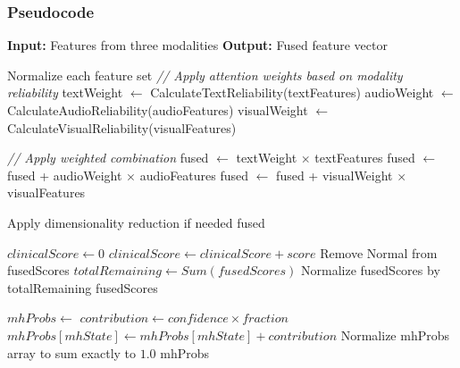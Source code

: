 \documentclass[11pt]{report}
\begin{document}
\subsubsection*{Pseudocode}
\begin{algorithm}[H]
\caption{Multi-modal Feature Fusion}
\label{alg:feature_fusion}
\begin{algorithmic}[1]
    \State \textbf{Input:} Features from three modalities
    \State \textbf{Output:} Fused feature vector
    
    \State Normalize each feature set
    \State \textit{// Apply attention weights based on modality reliability}
    \State textWeight $\gets$ CalculateTextReliability(textFeatures)
    \State audioWeight $\gets$ CalculateAudioReliability(audioFeatures)
    \State visualWeight $\gets$ CalculateVisualReliability(visualFeatures)
    
    \State \textit{// Apply weighted combination}
    \State fused $\gets$ textWeight $\times$ textFeatures
    \State fused $\gets$ fused + audioWeight $\times$ audioFeatures
    \State fused $\gets$ fused + visualWeight $\times$ visualFeatures
    
    \State Apply dimensionality reduction if needed
    \State \Return fused
\EndProcedure
\end{algorithmic}
\end{algorithm}

\begin{algorithm}[H]
\caption{Fuse Decisions: Clinical Suppression Heuristic}
\label{alg:fusion_suppression}
\begin{algorithmic}[1]
    \State $clinicalScore \gets 0$
            \State $clinicalScore \gets clinicalScore + score$
        \EndIf
    \EndFor
        \State Remove Normal from fusedScores
        \State $totalRemaining \gets Sum(fusedScores)$
        \State Normalize fusedScores by totalRemaining
    \EndIf
    \State \Return fusedScores
\EndProcedure
\end{algorithmic}
\end{algorithm}

\begin{algorithm}[H]
\caption{Facial Emotion to Mental Health Mapping}
\label{alg:fusion_facial}
\begin{algorithmic}[1]
    \State $mhProbs \gets {}$
                \State $contribution \gets confidence \times fraction$
                \State $mhProbs[mhState] \gets mhProbs[mhState] + contribution$
            \EndFor
        \EndIf
    \EndFor
    \State Normalize mhProbs array to sum exactly to $1.0$
    \State \Return mhProbs
\EndProcedure
\end{algorithmic}
\end{algorithm}
\end{document}
